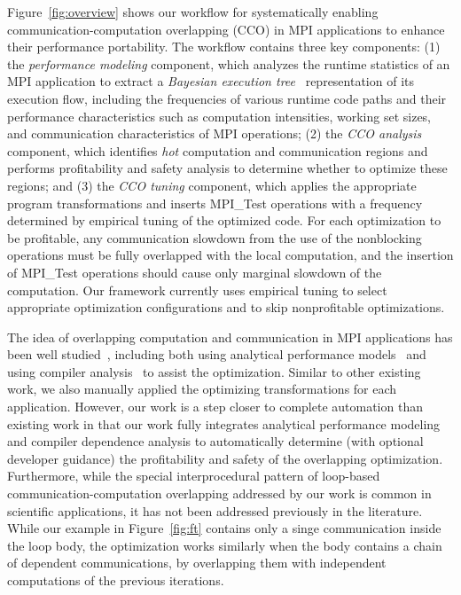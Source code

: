 Figure~\ref{fig:overview} shows our workflow for systematically
enabling communication-computation overlapping (CCO) in MPI
applications to enhance their performance portability.  The
workflow contains three key components: (1) the \emph{performance
  modeling} component, which analyzes the runtime statistics of an MPI
application to extract a \emph{Bayesian execution
  tree}~\cite{jichi:ipdps14} representation of its execution flow,
including the frequencies of various runtime code paths and their
performance characteristics such as computation intensities, working
set sizes, and communication characteristics of MPI operations; (2)
the \emph{CCO analysis} component, which identifies \emph{hot}
computation and communication regions
and performs profitability and safety
analysis to determine whether to optimize these regions; and (3) the \emph{CCO
  tuning} component, which applies the appropriate program
transformations
and inserts MPI\_Test operations with a frequency
determined by empirical tuning of the optimized code.
For each optimization to be profitable, any
communication slowdown from the use of the nonblocking operations must
be fully overlapped with the local computation, and the insertion of
MPI\_Test operations should cause only marginal slowdown of the computation.
Our framework currently
uses empirical tuning to select appropriate
optimization configurations and to skip nonprofitable optimizations.

The idea of overlapping computation and communication in MPI applications has been
well studied~\cite{danalis:sc05,fishgold:ipdps06}, including both using analytical performance
models~\cite{iancu:ppopp07}
and using compiler analysis~\cite{danalis:ics09} to assist the optimization.
Similar to other existing work, we also manually applied the optimizing transformations for each application.
However, our work is a step closer to complete automation than existing work in that our work fully integrates analytical performance modeling and compiler dependence analysis to automatically
determine (with optional developer guidance) the profitability and safety of the overlapping optimization. 
Furthermore, while the special interprocedural pattern of loop-based
communication-computation overlapping addressed by our work is common in scientific applications,  it has not been addressed previously in the literature.
While our example in Figure~\ref{fig:ft} contains only a singe communication inside the loop body, the optimization works similarly
when the body contains a chain of dependent communications, by overlapping them with independent computations of the previous iterations.

